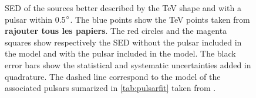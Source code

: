 \begin{figure}[h!]
{\label{fig:hessj1718}
}
\caption{\label{fig:sedsourcespuls2}SED of the sources better described by the TeV shape and with a pulsar within 0.5$\mbox{$^\circ$}$. The blue points show the TeV points taken from \textbf{rajouter tous les papiers}. The red circles and the magenta squares show respectively the SED without the pulsar included in the model and with the pulsar included in the model. The black error bars show the statistical and   systematic uncertainties added in quadrature. The dashed line correspond to the model of the associated pulsars sumarized in \ref{tab:pulsarfit} taken from \cite{2012ApJS..199...31N}.}
\end{figure}

\begin{figure}[h!]
\centering



\end{figure}

